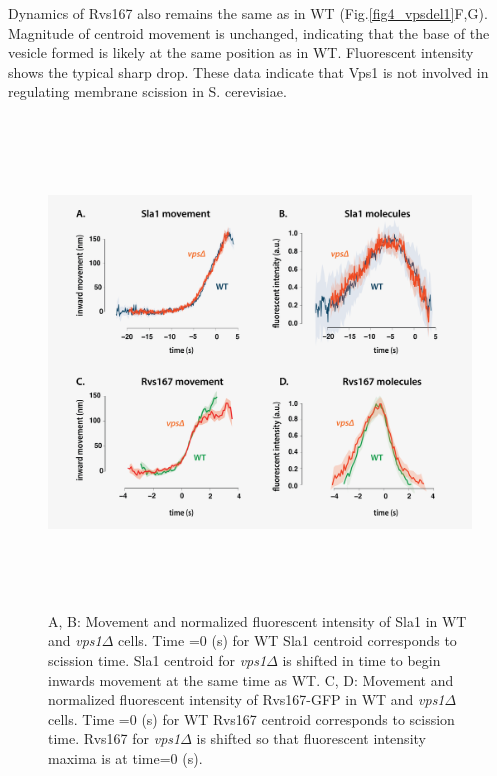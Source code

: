 \vspace{5mm}
Dynamics of Rvs167 also remains the same as in WT (Fig.\ref{fig4_vpsdel1}F,G). Magnitude of centroid movement is unchanged, indicating that the base of the vesicle formed is likely at the same position as in WT. Fluorescent intensity shows the typical sharp drop. These data indicate that Vps1 is not involved in regulating membrane scission in S. cerevisiae.  

\vspace{5mm}

	\begin{figure}[H]
	\centering
	\includegraphics[width=13cm,height=13cm,keepaspectratio]{figures/results_final/vps2}
	\caption[Tracking endocytic proteins in \textit{vps1$\Delta$} cells]
	{A, B: Movement and normalized fluorescent intensity of Sla1 in WT and \textit{vps1$\Delta$} cells. Time =0 (s) for WT Sla1 centroid corresponds to scission time. Sla1 centroid for \textit{vps1$\Delta$} is shifted in time to begin inwards movement at the same time as WT. 
		C, D: Movement and normalized fluorescent intensity of Rvs167-GFP in WT and  \textit{vps1$\Delta$} cells. Time =0 (s) for WT Rvs167 centroid corresponds to scission time. Rvs167 for \textit{vps1$\Delta$} is shifted so that fluorescent intensity maxima is at time=0 (s).
		\label{fig4_vpsdel2}}
\end{figure}



